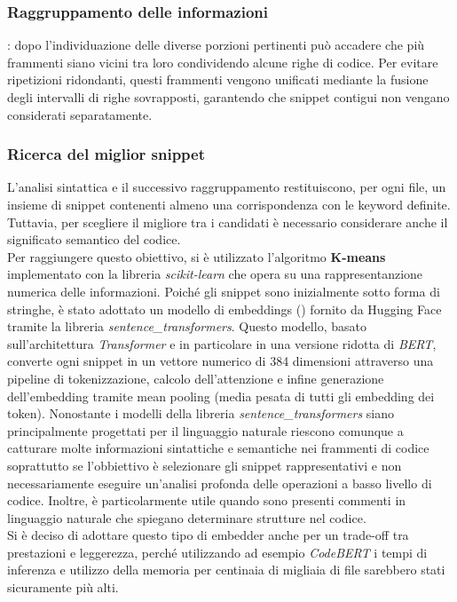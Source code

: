 \documentclass{article}
\begin{document}
\subsubsection{Raggruppamento delle informazioni}: dopo l'individuazione delle diverse porzioni pertinenti può accadere che più frammenti siano vicini tra loro condividendo alcune righe di codice. Per evitare ripetizioni ridondanti, questi frammenti vengono unificati mediante la fusione degli intervalli di righe sovrapposti, garantendo che snippet contigui non vengano considerati separatamente. 

\subsubsection{Ricerca del miglior snippet}
L'analisi sintattica e il successivo raggruppamento restituiscono, per ogni file, un insieme di snippet contenenti almeno una corrispondenza con le keyword definite. Tuttavia, per scegliere il migliore tra i candidati è necessario considerare anche il significato semantico del codice.\\
Per raggiungere questo obiettivo, si è utilizzato l'algoritmo \textbf{K-means} implementato con la libreria \textit{scikit-learn}\cite{scikit-learn} che opera su una rappresentanzione numerica delle informazioni. Poiché gli snippet sono inizialmente sotto forma di stringhe, è stato adottato un modello di embeddings (\cite{all-MiniLM-L6-v2}) fornito da Hugging Face tramite la libreria \textit{sentence\_transformers}. Questo modello, basato sull’architettura \textit{Transformer} e in particolare in una versione ridotta di \textit{BERT}, converte ogni snippet in un vettore numerico di 384 dimensioni attraverso una pipeline di tokenizzazione, calcolo dell’attenzione e infine generazione dell’embedding tramite mean pooling (media pesata di tutti gli embedding dei token). Nonostante i modelli della libreria \textit{sentence\_transformers} siano principalmente progettati per il linguaggio naturale riescono comunque a catturare molte informazioni sintattiche e semantiche nei frammenti di codice soprattutto se l'obbiettivo è selezionare gli snippet rappresentativi e non necessariamente eseguire un'analisi profonda delle operazioni a basso livello di codice. Inoltre, è particolarmente utile quando sono presenti commenti in linguaggio naturale che spiegano determinare strutture nel codice.\\ 
Si è deciso di adottare questo tipo di embedder anche per un trade-off tra prestazioni e leggerezza, perché utilizzando ad esempio \textit{CodeBERT}\cite{feng2020codebertpretrainedmodelprogramming} i tempi di inferenza e utilizzo della memoria per centinaia di migliaia di file sarebbero stati sicuramente più alti. 
\end{document}
